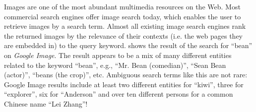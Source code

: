 %
%
%

%
Images are one of the most abundant multimedia resources on the Web.
Most commercial search engines offer image search today,
which enables the user to retrieve images by a search term.
Almost all existing image search engines rank the returned images
by the relevance of their contexts (i.e. the web pages they are
embedded in) to the query keyword. 
shows the result of the search for ``bean'' on
\textit{Google Image}\cite{google}.
The result appears to be a mix of many different entities related
to the keyword ``bean'', e.g.,
``Mr. Bean (comedian)'', ``Sean Bean (actor)'',
``beans (the crop)'', etc. Ambiguous search terms like this
are not rare: Google Image results include at least two different entities for
``kiwi'', three for ``explorer'', six for ``Anderson'' and over ten different
persons  for a common Chinese name ``Lei Zhang''!

